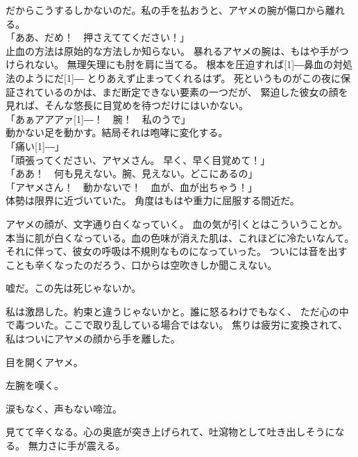 \documentclass[../IHMain]{subfiles}
\begin{document}
だからこうするしかないのだ。私の手を払おうと、アヤメの腕が傷口から離れる。\\
「ああ、だめ！　押さえててください！」\\
止血の方法は原始的な方法しか知らない。
暴れるアヤメの腕は、もはや手がつけられない。
無理矢理にも肘を肩に当てる。
根本を圧迫すれば\scalebox{3}[1]{―}鼻血の対処法のようにだ\scalebox{3}[1]{―}
とりあえず止まってくれるはず。
死というものがこの夜に保証されているのかは、まだ断定できない要素の一つだが、
緊迫した彼女の顔を見れば、そんな悠長に目覚めを待つだけにはいかない。\\
「あぁアアアァ\scalebox{3}[1]{―}！　腕！　私のうで」\\
動かない足を動かす。結局それは咆哮に変化する。\\
「痛い\scalebox{3}[1]{―}」\\
「頑張ってください、アヤメさん。
早く、早く目覚めて！」\\
「ああ！　何も見えない。腕、見えない。どこにあるの」\\
「アヤメさん！　動かないで！　血が、血が出ちゃう！」\\
体勢は限界に近づいていた。
角度はもはや重力に屈服する間近だ。

アヤメの顔が、文字通り白くなっていく。
血の気が引くとはこういうことか。
本当に肌が白くなっている。血の色味が消えた肌は、これほどに冷たいなんて。
それに伴って、彼女の呼吸は不規則なものになっていった。
ついには音を出すことも辛くなったのだろう、口からは空吹きしか聞こえない。

嘘だ。この先は死じゃないか。

私は激昂した。約束と違うじゃないかと。誰に怒るわけでもなく、
ただ心の中で毒ついた。ここで取り乱している場合ではない。
焦りは疲労に変換されて、私はついにアヤメの顔から手を離した。

目を開くアヤメ。

左腕を嘆く。

涙もなく、声もない啼泣。

見てて辛くなる。心の奥底が突き上げられて、吐瀉物として吐き出しそうになる。
無力さに手が震える。
\end{document}
